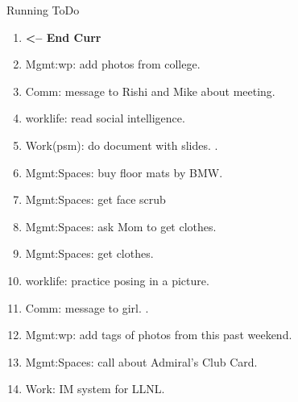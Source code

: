 \begin{columns}
\begin{column}{0.6\linewidth}
\begin{block}{Running ToDo}
\begin{enumerate}
      \item \tiny \textbf{ <-- End Curr }
      \item \tiny Mgmt:wp: add photos from college. 
      \item \tiny Comm: message to Rishi and Mike about meeting. 
      \item \tiny worklife: read social intelligence.  
      \item \tiny Work(psm): do document with slides. .
      \item \tiny Mgmt:Spaces: buy floor mats by BMW. 
      \item \tiny Mgmt:Spaces: get face scrub
      \item \tiny Mgmt:Spaces: ask Mom to get clothes.
      \item \tiny Mgmt:Spaces: get clothes. 
      \item \tiny worklife: practice posing in a picture.  
      \item \tiny Comm: message to girl.  . 
      \item \tiny Mgmt:wp: add tags of photos from this past weekend.  
      \item \tiny Mgmt:Spaces: call about Admiral's Club Card.
      \item \tiny Work: IM system for LLNL. 
        
      \end{enumerate}
    \end{block}
  

\end{column}
\end{columns}
